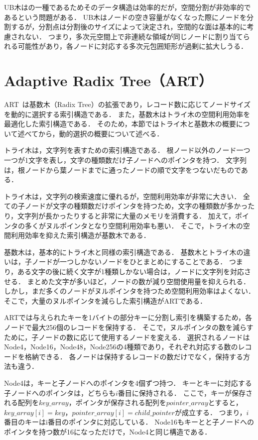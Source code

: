 UB木は\BTree の一種であるためそのデータ構造は効率的だが，空間分割が非効率的であるという問題がある．
UB木はノードの空き容量がなくなった際にノードを分割するが，分割点は分割後のサイズによって決定され，空間的な面は基本的に考慮されない．
つまり，多次元空間上で非連続な領域が同じノードに割り当てられる可能性があり，各ノードに対応する多次元包囲矩形が過剰に拡大しうる．

\section{Adaptive Radix Tree（ART）}

ART~\cite{icde:Leis2013}は基数木（Radix Tree）の拡張であり，レコード数に応じてノードサイズを動的に選択する索引構造である．
また，基数木はトライ木の空間利用効率を最適化した索引構造である．
そのため，本節ではトライ木と基数木の概要について述べてから，動的選択の概要について述べる．

トライ木は，文字列を表すための索引構造である．
根ノード以外のノード一つ一つが1文字を表し，文字の種類数だけ子ノードへのポインタを持つ．
文字列は，根ノードから葉ノードまでに通ったノードの順で文字をつないだものである．

トライ木は，文字列の検索速度に優れるが，空間利用効率が非常に大きい．
全ての子ノードが文字の種類数だけポインタを持つため，文字の種類数が多かったり，文字列が長かったりすると非常に大量のメモリを消費する．
加えて，ポインタの多くがヌルポインタとなり空間利用効率も悪い．
そこで，トライ木の空間利用効率を抑えた索引構造が基数木である．

基数木は，基本的にトライ木と同様の索引構造である．
基数木とトライ木の違いは，子ノードが一つしかないノードをひとまとめにすることである．
つまり，ある文字の後に続く文字が1種類しかない場合は，ノードに文字列を対応させる．
まとめた文字が多いほど，ノードの数が減り空間使用量を抑えられる．
しかし，まだ多くのノードがヌルポインタを持つため空間利用効率はよくない．
そこで，大量のヌルポインタを減らした索引構造がARTである．

ARTでは与えられたキーを1バイトの部分キーに分割し索引を構築するため，各ノードで最大256個のレコードを保持する．
そこで，ヌルポインタの数を減らすために，子ノードの数に応じて使用するノードを変える．
選択されるノードはNode4，Node16，Node48，Node256の4種類であり，それぞれ対応する数のレコードを格納できる．
各ノードは保持するレコードの数だけでなく，保持する方法も違う．

Node4は，キーと子ノードへのポインタを4個ずつ持つ．
キーとキーに対応する子ノードへのポインタは，どちらも$i$番目に保持される．
ここで，キーが保存される配列を$key\_array$，ポインタが保存される配列を$pointer\_array$とすると，$key\_array[i]=key$，$pointer\_array[i]=child\_pointer$が成立する．
つまり，$i$番目のキーはi番目のポインタに対応している．
Node16もキーとと子ノードへのポインタを持つ数が16になっただけで，Node4と同じ構造である．

